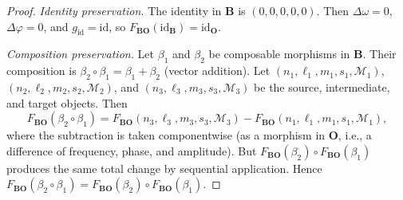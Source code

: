 \documentclass[twocolumn,10pt]{article}
\theoremstyle{remark}
\newcommand{\Depth}{\mathcal{M}}
\newcommand{\CatO}{\mathbf{O}}
\newcommand{\CatB}{\mathbf{B}}
\newcommand{\Fbo}{F_{\CatB\CatO}}
\begin{document}
\begin{proof}
\textit{Identity preservation.}
The identity in $\CatB$ is $(0,0,0,0,0)$.
Then $\Delta\omega = 0$, $\Delta\varphi = 0$, and $g_{\mathrm{id}} = \mathrm{id}$, so $\Fbo(\mathrm{id}_{\CatB}) = \mathrm{id}_{\CatO}$.

\textit{Composition preservation.}
Let $\beta_1$ and $\beta_2$ be composable morphisms in $\CatB$.
Their composition is $\beta_2 \circ \beta_1 = \beta_1 + \beta_2$ (vector addition).
Let $(n_1,\ell_1,m_1,s_1,\Depth_1)$, $(n_2,\ell_2,m_2,s_2,\Depth_2)$, and $(n_3,\ell_3,m_3,s_3,\Depth_3)$ be the source, intermediate, and target objects.
Then
\begin{equation}
\Fbo(\beta_2 \circ \beta_1) = \Fbo(n_3,\ell_3,m_3,s_3,\Depth_3) - \Fbo(n_1,\ell_1,m_1,s_1,\Depth_1),
\end{equation}
where the subtraction is taken componentwise (as a morphism in $\CatO$, i.e., a difference of frequency, phase, and amplitude).
But $\Fbo(\beta_2) \circ \Fbo(\beta_1)$ produces the same total change by sequential application.
Hence $\Fbo(\beta_2 \circ \beta_1) = \Fbo(\beta_2) \circ \Fbo(\beta_1)$.
\end{proof}
\end{document}
